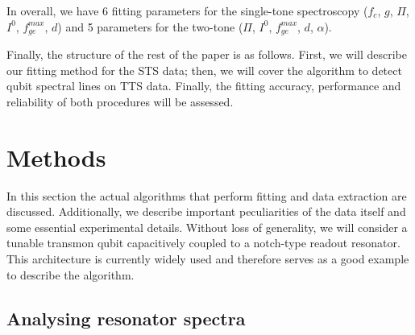 \documentclass[%
 aip,
 amsmath,amssymb,
 reprint,%
]{revtex4-1}
\begin{document}
In overall, we have 6 fitting parameters for the single-tone spectroscopy ($f_c$, $g$, $\Pi$, $I^0$, $f_{ge}^{max}$, $d$) and  5 parameters for the two-tone ($\Pi$, $I^0$, $f_{ge}^{max}$, $d$, $\alpha$).

Finally, the structure of the rest of the paper is as follows. First, we will describe our fitting method for the STS data; then, we will cover the algorithm to detect qubit spectral lines on TTS data. Finally, the fitting accuracy, performance and reliability of both procedures will be assessed.



\section{Methods}

In this section the actual algorithms that perform fitting and data extraction are discussed. Additionally, we describe important peculiarities of the data itself and some essential experimental details. Without loss of generality, we will consider a tunable transmon\cite{koch2007} qubit capacitively coupled to a notch-type readout resonator. This architecture is currently widely used\cite{barends2013} and therefore serves as a good example to describe the algorithm.


\subsection{Analysing resonator spectra}
\end{document}

